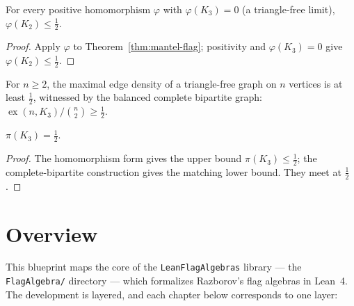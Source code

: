 \begin{theorem}
  \label{thm:mantel-hom}
  \leanok
  For every positive homomorphism $\varphi$ with $\varphi(K_3) = 0$ (a
  triangle-free limit), $\varphi(K_2) \le \tfrac12$.
\end{theorem}
\begin{proof}
  \leanok
  Apply $\varphi$ to Theorem~\ref{thm:mantel-flag}; positivity and
  $\varphi(K_3)=0$ give $\varphi(K_2) \le \tfrac12$.
\end{proof}

\begin{lemma}
  \label{lem:lower-bound}
  \leanok
  For $n \ge 2$, the maximal edge density of a triangle-free graph on $n$
  vertices is at least $\tfrac12$, witnessed by the balanced complete bipartite
  graph:
  $\operatorname{ex}(n,K_3)/\binom{n}{2} \ge \tfrac12$.
\end{lemma}

\begin{theorem}
  \label{thm:turan-k3}
  \leanok
  $\pi(K_3) = \tfrac12$.
\end{theorem}
\begin{proof}
  \leanok
  The homomorphism form gives the upper bound $\pi(K_3) \le \tfrac12$; the
  complete-bipartite construction gives the matching lower bound. They meet at
  $\tfrac12$.
\end{proof}


\chapter{Overview}
\label{chap:overview}

This blueprint maps the core of the \texttt{LeanFlagAlgebras} library --- the
\texttt{FlagAlgebra/} directory --- which formalizes Razborov's flag algebras in
Lean~4. The development is layered, and each chapter below corresponds to one
layer:

